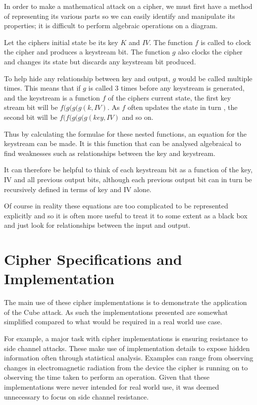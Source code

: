 \documentclass{report}
\begin{document}
In order to make a mathematical attack on a cipher, we must first have a method
of representing its various parts so we can easily identify and manipulate its properties; it is difficult to perform algebraic operations on a diagram.

Let the ciphers initial state be its key $K$ and $IV$. The function $f$ is called to clock the cipher and produces a keystream bit. The function $g$ also clocks the cipher and changes its state but discards any keystream bit produced.

To help hide any relationship between key and output, $g$ would be called multiple times. This means that if $g$ is called 3 times before any keystream is generated, and the keystream is a function $f$ of the ciphers current state, the first key stream bit will be $f(g(g(g(k, IV)$. As $f$ often updates the state in turn , the second bit will be $f(f(g(g(g(key, IV)$ and so on.

Thus by calculating the formulae for these nested functions, an equation for the keystream can be made. It is this function that can be analysed algebraical to find weaknesses such as relationships between the key and keystream.

It can therefore be helpful to think of each keystream bit as a function of the key, IV and all previous output bits, although each previous output bit can in turn be recursively defined in terms of key and IV alone.

Of course in reality these equations are too complicated to be represented explicitly and so it is often more useful to treat it to some extent as a black box and just look for relationships between the input and output.
\chapter{Cipher Specifications  and Implementation}
The main use of these cipher implementations is to demonstrate the application of the Cube attack. As such the implementations presented are somewhat simplified compared to what would be required in a real world use case.

For example, a major task with cipher implementations is ensuring resistance to side channel attacks. These make use of implementation details to expose hidden information often through statistical analysis. Examples can range from observing changes in electromagnetic radiation from the device the cipher is running on\cite{electroSide} to observing the time taken to perform an operation\cite{timingAttack}. Given that these implementations were never intended for real world use, it was deemed unnecessary to focus on side channel resistance.
\end{document}
